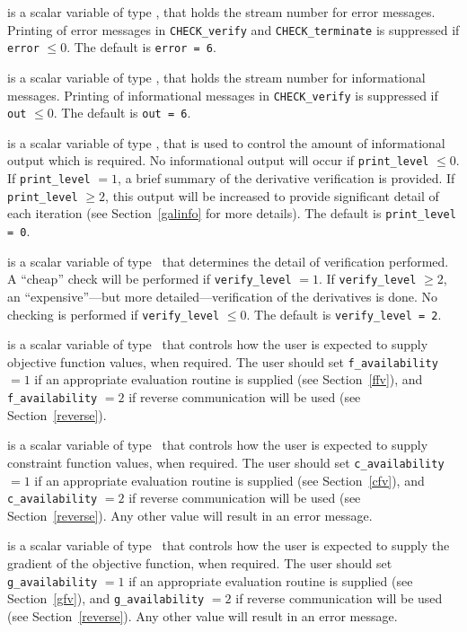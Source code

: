 \documentclass{galahad}
\newcommand{\packagename}{CHECK}
\begin{document}
\begin{description}

 is a scalar variable of type \integer, that holds the
stream number for error messages. Printing of error messages in 
{\tt \packagename\_verify} and {\tt \packagename\_terminate} 
is suppressed if {\tt error} $\leq 0$.
The default is {\tt error = 6}.

 is a scalar variable of type \integer, that holds the
stream number for informational messages. Printing of informational messages in 
{\tt \packagename\_verify} is suppressed if {\tt out} $\leq 0$.
The default is {\tt out = 6}.

 is a scalar variable of type \integer, that is used
to control the amount of informational output which is required. No 
informational output will occur if {\tt print\_level} $\leq 0$. If 
{\tt print\_level} $= 1$, a brief summary of the derivative
verification is provided.  If {\tt print\_level} $\geq 2$, this output will be
increased to provide significant detail of each iteration (see
Section~\ref{galinfo} for more details).
The default is {\tt print\_level = 0}.

 is a scalar variable of type \integer\
that determines the detail of verification performed.  A ``cheap''
check will be performed if {\tt verify\_level} $= 1$. If 
{\tt verify\_level} $\geq 2$, an ``expensive''---but more
detailed---verification of the derivatives is done.  No
checking is performed if {\tt verify\_level} $\leq 0$.
The default is {\tt verify\_level = 2}.

 is a scalar variable of type \integer\
that controls how the user is expected to supply objective function
values, when required.  The user should set {\tt f\_availability} $=1$
if an appropriate evaluation routine is supplied (see
Section~\ref{ffv}), and {\tt f\_availability} $=2$ if reverse
communication will be used (see Section~\ref{reverse}).

 is a scalar variable of type \integer\
that controls how the user is expected to supply constraint function
values, when required.  The user should set {\tt c\_availability} $=1$
if an appropriate evaluation routine is supplied (see
Section~\ref{cfv}), and {\tt c\_availability} $=2$ if reverse
communication will be used (see Section~\ref{reverse}).  Any other
value will result in an error message.

\itt{g\_availability} is a scalar variable of type \integer\
that controls how the user is expected to supply the gradient of the
objective function, when required.  The user should set {\tt g\_availability} $=1$
if an appropriate evaluation routine is supplied (see
Section~\ref{gfv}), and {\tt g\_availability} $=2$ if reverse
communication will be used (see Section~\ref{reverse}).  Any other
value will result in an error message.


\end{description}
\end{document}
